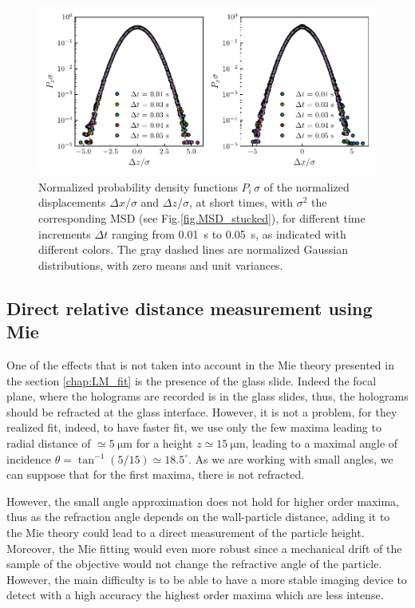 \begin{figure}[H]
	\centering
	\includegraphics{02_body/chapter4/images/stucked_particle/P_xz_stucked.pdf}
	\caption{ Normalized probability density functions $P_i\,\sigma$ of the normalized displacements $\Delta x/\sigma$ and $\Delta z/\sigma$, at short times, with $\sigma^2$ the corresponding MSD (see Fig.\ref{fig.MSD_stucked}), for different time increments $\Delta t$ ranging from 0.01~s to 0.05~s, as indicated with different colors. The gray dashed lines are normalized Gaussian distributions, with zero means and unit variances.}
	\label{fig.P_dxz_stucked}
\end{figure}

\subsection{Direct relative distance measurement using Mie}

One of the effects that is not taken into account in the Mie theory presented in the section \ref{chap:LM_fit} is the presence of the glass slide. Indeed the focal plane, where the holograms are recorded is in the glass slides, thus, the holograms should be refracted at the glass interface. However, it is not a problem, for they realized fit, indeed, to have faster fit, we use only the few maxima leading to radial distance of $\simeq 5 ~\mathrm{\mu m }$ for a height $z\simeq 15~\mathrm{\mu m}$, leading to a maximal angle of incidence $\theta = \tan^{-1} (5/15) \simeq 18.5 ^{\circ} $. As we are working with small angles, we can suppose that for the first maxima, there is not refracted. 

However, the small angle approximation does not hold for higher order maxima, thus as the refraction angle depends on the wall-particle distance, adding it to the Mie theory could lead to a direct measurement of the particle height. Moreover, the Mie fitting would even more robust since a mechanical drift of the sample of the objective would not change the refractive angle of the particle. However, the main difficulty is to be able to have a more stable imaging device to detect with a high accuracy the highest order maxima which are less intense.


